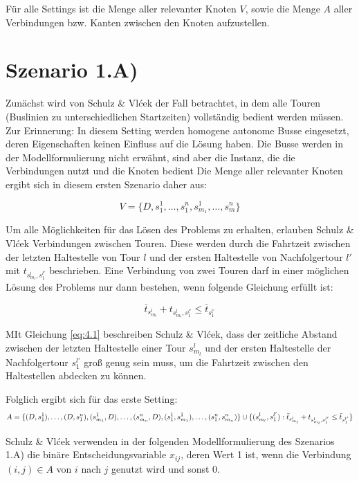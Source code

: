 Für alle Settings ist die Menge aller relevanter Knoten $V$, sowie die Menge $A$ aller Verbindungen bzw. Kanten zwischen den Knoten aufzustellen.

\section{Szenario 1.A)}
\label{sec:4.2}
\label{sec:Szenario 1.A)}
Zunächst wird von Schulz \& Vlćek der Fall betrachtet, in dem alle Touren (Buslinien zu unterschiedlichen Startzeiten) vollständig bedient werden müssen. Zur Erinnerung: In diesem Setting werden homogene autonome Busse eingesetzt, deren Eigenschaften keinen Einfluss auf die Lösung haben. Die Busse werden in der Modellformulierung nicht erwähnt, sind aber die Instanz, die die Verbindungen nutzt und die Knoten bedient
Die Menge aller relevanter Knoten ergibt sich in diesem ersten Szenario daher aus:

\[
V = \{ D, s^1_1, \dots, s^n_1, s^1_{m_1}, \dots, s^n_m \}
\]

Um alle Möglichkeiten für das Lösen des Problems zu erhalten, erlauben Schulz \& Vlćek Verbindungen zwischen Touren. Diese werden durch die Fahrtzeit zwischen der letzten Haltestelle von Tour $l$ und der ersten Haltestelle von Nachfolgertour $l'$ mit $t_{s^l_{m_l}, s^{l'}_1}$ beschrieben. Eine Verbindung von zwei Touren darf in einer möglichen Lösung des Problems nur dann bestehen, wenn folgende Gleichung erfüllt ist: 

\begin{equation}
    \label{eq:4.1}
    \bar{t}_{s^l_{m_l}} + t_{s^l_{m_l}, s^{l'}_1} \leq \bar{t}_{s^{l'}_1}
\end{equation}

MIt Gleichung \ref{eq:4.1} beschreiben Schulz \& Vlćek, dass der zeitliche Abstand zwischen der letzten Haltestelle einer Tour $s^l_{m_l}$ und der ersten Haltestelle der Nachfolgertour $s^{l'}_1$ groß genug sein muss, um die Fahrtzeit zwischen den Haltestellen abdecken zu können.

Folglich ergibt sich für das erste Setting:
\[
A = \{(D, s_1^1), \ldots, (D, s_1^n), (s_{m_1}^1, D), \ldots, (s_{m_n}^n, D), (s_1^1, s_{m_1}^1), \ldots, (s_1^n, s_{m_n}^n)\}   \\   
\cup \{(s_{m_l}^l, s_1^{l'}) : \bar{t}_{s_{m_l}^l} + t_{s_{m_l}^l, s_1^{l'}} \leq \bar{t}_{s_1^{l'}}\}
\]

Schulz \& Vlćek verwenden in der folgenden Modellformulierung des Szenarios 1.A) die binäre Entscheidungsvariable $x_{ij}$, deren Wert 1 ist, wenn die Verbindung $(i,j) \in A$ von $i$ nach $j$  genutzt wird und sonst 0.

